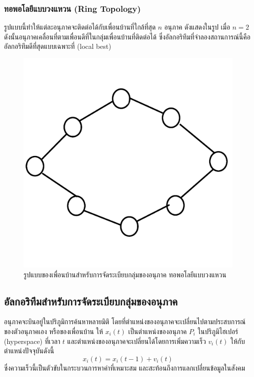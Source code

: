 \subsubsection{ทอพอโลยีแบบวงแหวน (Ring Topology)}
รูปแบบนี้ทำให้แต่ละอนุภาคจะติดต่อได้กับเพื่อนบ้านที่ใกล้ที่สุด \(n\) อนุภาค ดังแสดงในรูป เมื่อ \(n=2\) ดังนั้นอนุภาคเคลื่อนที่ตามเพื่อนดีที่ในกลุ่มเพื่อนบ้านที่ติดต่อได้ ซึ่งอัลกอริทึมที่จำลองสถานการณ์นี้คือ อัลกอริทึมดีที่สุดแบบเฉพาะที่ (local best) \cite{Sansanee}
\begin{figure}[ht]
    \centering
    \includegraphics[scale=0.3]{images/ring_topology.png}
    \caption{รูปแบบของเพื่อนบ้านสำหรับการจัดระเบียบกลุ่มของอนุภาค ทอพอโลยีแบบวงแหวน}
    \label{fig:6}
\end{figure}

\subsection{อัลกอริทึมสำหรับการจัดระเบียบกลุ่มของอนุภาค}
อนุภาคจะบินอยู่ในปริภูมิการค้นหาหลายมิติ โดยที่ตำแหน่งของอนุภาคจะเปลี่ยนไปตามประสบการณ์ของตัวอนุภาคเอง หรือของเพื่อนบ้าน ให้ \(x_{i}(t)\) เป็นตำแหน่งของอนุภาค \(P_{i}\) ในปริภูมิไฮเปอร์ (hyperspace) ที่เวลา \(t\) และตำแหน่งของอนุภาคจะเปลี่ยนได้โดยการเพิ่มความเร็ว \(v_{i}(t)\) ให้กับตำแหน่งปัจจุบันดังนี้ \cite{Engelbrecht}
\begin{equation}
  x_{i}(t) = x_{i}(t-1)+v_{i}(t)
\end{equation}
ซึ่งความเร็วนี้เป็นตัวขับในกระบวนการหาค่าที่เหมาะสม และสะท้อนถึงการแลกเปลี่ยนข้อมูลในสังคม
